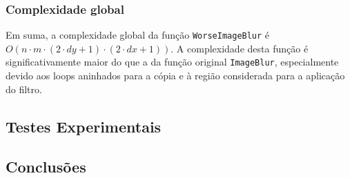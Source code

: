 \documentclass{report}
\begin{document}
\subsubsection{Complexidade global}
Em suma, a complexidade global da função \texttt{WorseImageBlur} é \(O(n \cdot m \cdot (2 \cdot dy + 1) \cdot (2 \cdot dx + 1))\). 
A complexidade desta função é significativamente maior do que a da função original \texttt{ImageBlur},
especialmente devido aos loops aninhados para a cópia e à região considerada para a aplicação do filtro.


\subsection{Testes Experimentais}


\subsection{Conclusões}





\printbibliography
\end{document}
